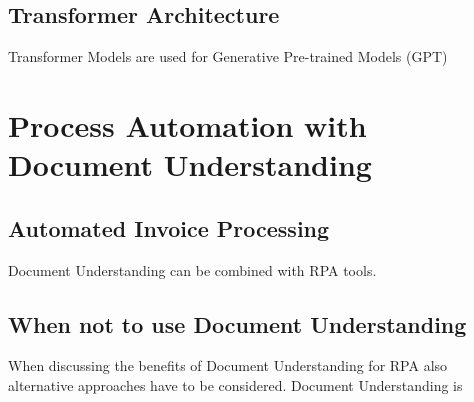 \subsection{Transformer Architecture}
\label{Transformer}
Transformer Models are used for Generative Pre-trained Models (GPT)
\cite{vaswaniattentionneed}

\section{Process Automation with Document Understanding}
\subsection{Automated Invoice Processing}
Document Understanding can be combined with \ac{RPA} tools.
\subsection{When not to use Document Understanding}
When discussing the benefits of Document Understanding for \ac{RPA} also alternative approaches have to be considered. Document Understanding is 

\cite{alt2002integrierte,au2001should}